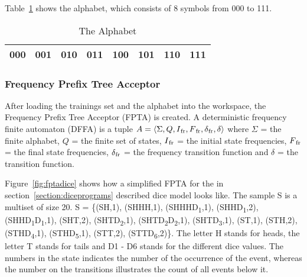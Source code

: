 \documentclass[
a4paper,
12pt
]{scrartcl}
\begin{document}
Table~\ref{table:alphabet} shows the alphabet, which consists of 8 symbols from 000 to 111.

\begin{table}[ht!]
\centering
\begin{tabular}{|l|l|l|l|l|l|l|l|}
\hline
000 & 001 & 010 & 011 & 100 & 101 & 110 & 111 \\ \hline
\end{tabular}
\caption{The Alphabet}
\label{table:alphabet}
\end{table}

\subsubsection{Frequency Prefix Tree Acceptor}
After loading the trainings set and the alphabet into the workspace, the Frequency Prefix Tree Acceptor (FPTA) is created. A deterministic frequency finite automaton (DFFA) is a tuple $A = \langle \Sigma, Q, I\textsubscript{fr}, F\textsubscript{fr}, \delta\textsubscript{fr}, \delta \rangle$ where $ \Sigma $ = the finite alphabet, $Q$ = the finite set of states, $I\textsubscript{fr}$ = the initial state frequencies, $F\textsubscript{fr}$ = the final state frequencies, $\delta\textsubscript{fr}$ = the frequency transition function and $ \delta$ = the transition function.

Figure~\ref{fig:fptadice} shows how a simplified FPTA for the in section~\ref{section:diceprograms} described dice model looks like. The sample S is a multiset of size 20. S = \{(SH,1), (SHHH,1), (SHHHD\textsubscript{1},1), (SHHD\textsubscript{1},2), (SHHD\textsubscript{1}D\textsubscript{1},1), (SHT,2), (SHTD\textsubscript{2},1), (SHTD\textsubscript{2}D\textsubscript{2},1), (SHTD\textsubscript{3},1), (ST,1), (STH,2), (STHD\textsubscript{4},1), (STHD\textsubscript{5},1), (STT,2), (STTD\textsubscript{6},2)\}. The letter H stands for heads, the letter T stands for tails and D1 - D6 stands for the different dice values. The numbers in the state indicates the number of the occurrence of the event, whereas the number on the transitions illustrates the count of all events below it.
\end{document}
